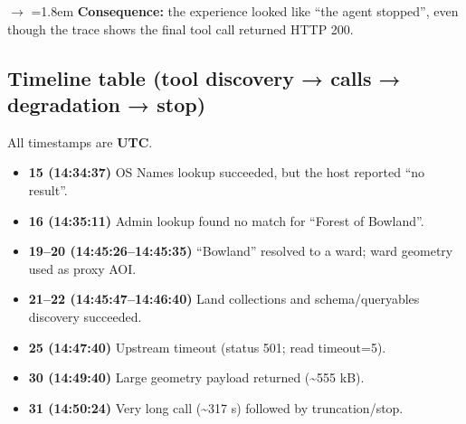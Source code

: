 \noindent$\rightarrow$ \hangindent=1.8em  \textbf{Consequence:} the experience looked like “the agent stopped”, even though the trace shows the final tool call returned HTTP 200.

\subsection{Timeline table (tool discovery → calls → degradation → stop)}

All timestamps are \textbf{UTC}. \cite{artefact_codex_trace_jsonl_2026_02_18,artefact_floor_question_analysis_2026_02_19,artefact_forensic_study_mcp_geo_2026_02_19}

\begin{itemize}[leftmargin=*]
  \item \textbf{15 (14:34:37)} OS Names lookup succeeded, but the host reported “no result”.
  \item \textbf{16 (14:35:11)} Admin lookup found no match for “Forest of Bowland”.
  \item \textbf{19--20 (14:45:26--14:45:35)} “Bowland” resolved to a ward; ward geometry used as proxy AOI.
  \item \textbf{21--22 (14:45:47--14:46:40)} Land collections and schema/queryables discovery succeeded.
  \item \textbf{25 (14:47:40)} Upstream timeout (status 501; read timeout=5).
  \item \textbf{30 (14:49:40)} Large geometry payload returned (\textasciitilde{}555 kB).
  \item \textbf{31 (14:50:24)} Very long call (\textasciitilde{}317 s) followed by truncation/stop.
\end{itemize}

